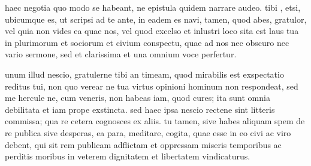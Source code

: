


 haec negotia quo modo se habeant, ne epistula quidem narrare audeo. tibi , etsi, ubicumque es, ut scripsi ad te ante, in eadem es navi, tamen, quod abes, gratulor, vel quia non vides ea quae nos, vel quod excelso et inlustri loco sita est laus tua in plurimorum et sociorum et civium conspectu, quae ad nos nec obscuro nec vario sermone, sed et clarissima et una omnium voce perfertur.

 unum illud nescio, gratulerne tibi an timeam, quod mirabilis est exspectatio reditus tui, non quo verear ne tua virtus opinioni hominum non respondeat, sed me hercule ne, cum veneris, non habeas iam, quod cures; ita sunt omnia debilitata et iam prope exstincta. sed haec ipsa nescio rectene sint litteris commissa; qua re cetera cognosces ex aliis. tu tamen, sive habes aliquam spem de re publica sive desperas, ea para, meditare, cogita, quae esse in eo civi ac viro debent, qui sit rem publicam adflictam et oppressam miseris temporibus ac perditis moribus in veterem dignitatem et libertatem vindicaturus.
